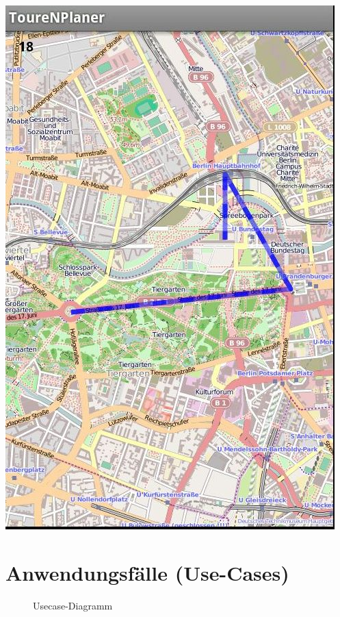 \documentclass[a4paper,10pt,titlepage]{article}
\makeatletter
\newcommand\novspace{\@minipagetrue}
\newenvironment{owncompactitem}{%
\compactitem
}{%
\@finalstrut\@arstrutbox
\@nameuse{endcompactitem}%
\aftergroup\let\aftergroup\@finalstrut\aftergroup\@gobble
}
\newenvironment{owncompactenum}{%
\compactenum
}{%
\@finalstrut\@arstrutbox
\@nameuse{endcompactenum}%
\aftergroup\let\aftergroup\@finalstrut\aftergroup\@gobble
}
\newcommand{\usecase}[7]
{\subsection{#1}
\setlength{\extrarowheight}{2pt}
\begin{tabular}{|p{0.2\textwidth}|p{0.9\textwidth}|}
\hline
  Akteure & #2\\\hline
  Ziel & #3\\\hline
  Vorbedingungen & \novspace
  	\begin{owncompactitem}[-] #4 \end{owncompactitem} \\\hline
  Normalablauf & \vspace{-7pt}
  	\begin{owncompactenum}[1.] #6 \end{owncompactenum} \\\hline
  Nachbedingungen & \novspace
  	\begin{owncompactitem}[-] #5 \end{owncompactitem} \\\hline
  #7
\end{tabular}
}
\makeatother
\begin{document}
\begin {center}
\includegraphics[scale=0.4]{media/android/map.jpg}
\end {center}
\newpage



\clearpage
\section{Anwendungsfälle (Use-Cases)}
\begin{figure}[H]
  \centering
  \caption{Usecase-Diagramm}
\end{figure}


\end{document}
